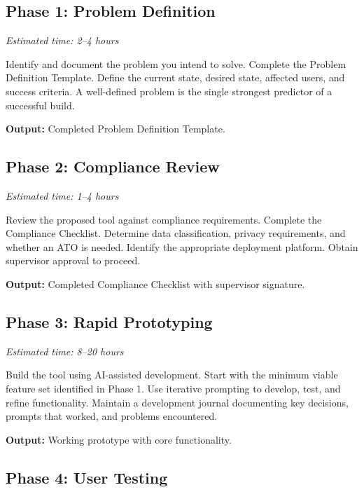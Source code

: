\documentclass[11pt,letterpaper]{article}
\begin{document}
\subsection{Phase 1: Problem Definition}
\label{sec:phase-1}

\noindent\textit{Estimated time: 2--4 hours}

Identify and document the problem you intend to solve. Complete the Problem
Definition Template. Define the current state, desired state, affected users,
and success criteria. A well-defined problem is the single strongest predictor
of a successful build.

\textbf{Output:} Completed Problem Definition Template.

\subsection{Phase 2: Compliance Review}
\label{sec:phase-2}

\noindent\textit{Estimated time: 1--4 hours}

Review the proposed tool against compliance requirements. Complete the Compliance
Checklist. Determine data classification, privacy requirements, and whether an
ATO is needed. Identify the appropriate deployment platform. Obtain supervisor
approval to proceed.

\textbf{Output:} Completed Compliance Checklist with supervisor signature.

\subsection{Phase 3: Rapid Prototyping}
\label{sec:phase-3}

\noindent\textit{Estimated time: 8--20 hours}

Build the tool using AI-assisted development. Start with the minimum viable
feature set identified in Phase 1. Use iterative prompting to develop, test,
and refine functionality. Maintain a development journal documenting key
decisions, prompts that worked, and problems encountered.

\textbf{Output:} Working prototype with core functionality.

\subsection{Phase 4: User Testing}
\label{sec:phase-4}
\end{document}

